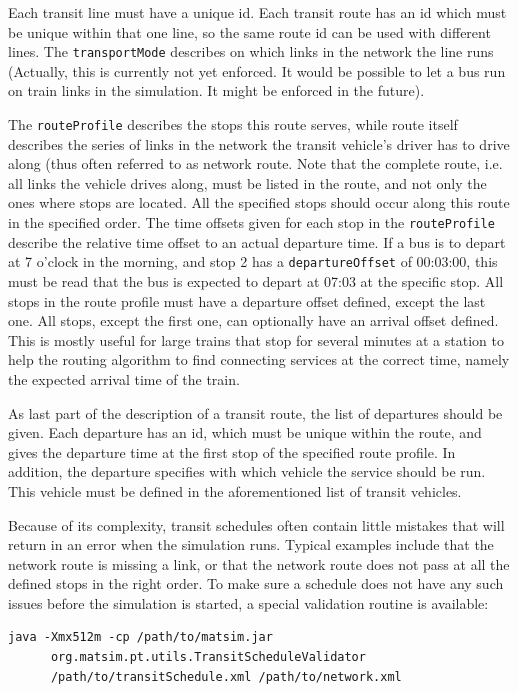 Each transit line must have a unique id. Each transit route has an id which must be unique within that one line, so the same route id can be used with different lines. The \lstinline|transportMode| describes on which links in the network the line runs (Actually, this is currently not yet enforced. It would be possible to let a bus run on train links in the simulation. It might be enforced in the future).

The \lstinline|routeProfile| describes the stops this route serves, while route itself describes the series of links in the network the transit vehicle's driver has to drive along (thus often referred to as network route. Note that the complete route, i.e. all links the vehicle drives along, must be listed in the route, and not only the ones where stops are located. All the specified stops should occur along this route in the specified order. The time offsets given for each stop in the \lstinline|routeProfile| describe the relative time offset to an actual departure time. If a bus is to depart at 7 o'clock in the morning, and stop 2 has a \lstinline|departureOffset| of 00:03:00, this must be read that the bus is expected to depart at 07:03 at the specific stop. All stops in the route profile must have a departure offset defined, except the last one. All stops, except the first one, can optionally have an arrival offset defined. This is mostly useful for large trains that stop for several minutes at a station to help the routing algorithm to find connecting services at the correct time, namely the expected arrival time of the train.

As last part of the description of a transit route, the list of departures should be given. Each departure has an id, which must be unique within the route, and gives the departure time at the first stop of the specified route profile. In addition, the departure specifies with which vehicle the service should be run. This vehicle must be defined in the aforementioned list of transit vehicles. 

Because of its complexity, transit schedules often contain little mistakes that will return in an error when the simulation runs. Typical examples include that the network route is missing a link, or that the network route does not pass at all the defined stops in the right order. To make sure a schedule does not have any such issues before the simulation is started, a special validation routine is available:

\begin{lstlisting}
java -Xmx512m -cp /path/to/matsim.jar  
      org.matsim.pt.utils.TransitScheduleValidator  
      /path/to/transitSchedule.xml /path/to/network.xml
\end{lstlisting}

